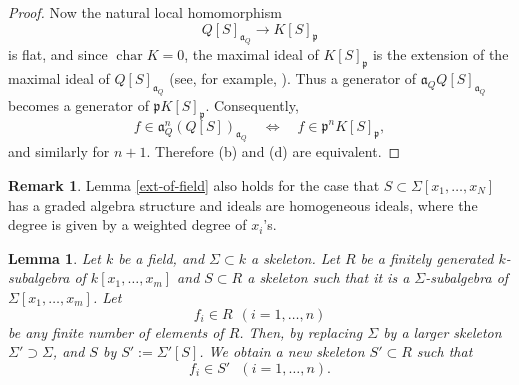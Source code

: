 \documentclass[a4paper]{amsart}
\newcommand{\p}{{\mathfrak{p}}}
\newcommand{\proj}{{\mathrm{Proj\ }}}
\newtheorem{lem}[thm]{Lemma}
\theoremstyle{definition}
\newtheorem{rem}[thm]{Remark}
\begin{document}
\begin{proof}
Now the natural local homomorphism
\[
Q[S]_{\mathfrak a_Q}\to K[S]_{\mathfrak p}
\]
is flat, and since $\operatorname{char}K=0$, the maximal ideal of
$K[S]_{\mathfrak p}$ is the extension of the maximal ideal of
$Q[S]_{\mathfrak a_Q}$ (see, for example, \cite[Lemma 33.5.3]{stack}).
Thus a generator of $\mathfrak a_QQ[S]_{\mathfrak a_Q}$ becomes a generator of
$\mathfrak pK[S]_{\mathfrak p}$.
Consequently,
\[
f\in \mathfrak a_Q^n (Q[S])_{\mathfrak a_Q}
\quad\Longleftrightarrow\quad
f\in \mathfrak p^n K[S]_{\mathfrak p},
\]
and similarly for $n+1$.
Therefore {\rm (b)} and {\rm (d)} are equivalent.
\end{proof}


\begin{rem} Lemma \ref{ext-of-field} 
also holds  for the case that $S \subset \Sigma[x_1,\ldots, x_N]$ has a graded algebra structure and ideals are  homogeneous ideals,
where the degree is given by a weighted degree of $x_i$'s.
\end{rem}




  
   
 

 
 
 
 
 
 
 



%




\begin{lem}\label{coef-extension} Let $k$ be a field, and $\Sigma\subset k$ a skeleton.
 Let $R$ be a finitely generated $k$-subalgebra of $ k[x_1,\ldots,x_m]$ and
   $S\subset R$ a skeleton such that it is a $\Sigma$-subalgebra of    $\Sigma[x_1,\ldots,x_m]$.
  Let $$f_i\in R\ \ (i=1,\ldots, n)$$
   be any finite number of elements of $R$.
  Then, by replacing $\Sigma$ by a larger skeleton $\Sigma'\supset \Sigma$, and $S$ by $S':=\Sigma'[S]$.
  We obtain a new skeleton $S'\subset R$ such that 
  $$f_i \in S'\ \ \  (i=1,\ldots, n).$$ 
\end{lem}
\end{document}
